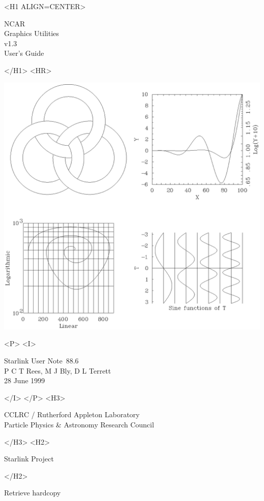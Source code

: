 \documentclass[twoside,11pt]{article}
\newcommand{\stardoccategory}  {Starlink User Note}
\newcommand{\stardocsource}    {sun\stardocnumber}
\newcommand{\stardocnumber}    {88.6}
\newcommand{\stardocauthors}   {P C T Rees, M J Bly, D L Terrett}
\newcommand{\stardocdate}      {28 June 1999}
\newcommand{\stardoctitle}     {NCAR \\ [1ex] Graphics Utilities}
\newcommand{\stardocversion}   {v1.3}
\newcommand{\stardocmanual}    {User's Guide}
\newcommand{\htmladdnormallink}[2]{#1}
\newcommand{\htmladdimg}[1]{}
\newcommand{\xlabel}[1]{}
\renewcommand{\_}{\texttt{\symbol{95}}}
\begin{document}
\begin{htmlonly}
   \xlabel{}
   \begin{rawhtml} <H1 ALIGN=CENTER> \end{rawhtml}
      \stardoctitle\\
      \stardocversion\\
      \stardocmanual
   \begin{rawhtml} </H1> <HR> \end{rawhtml}

\includegraphics[viewport=0 360 450 800,scale=0.8,clip]{sun88_cover.eps}

   \begin{rawhtml} <P> <I> \end{rawhtml}
   \stardoccategory\ \stardocnumber \\
   \stardocauthors \\
   \stardocdate
   \begin{rawhtml} </I> </P> <H3> \end{rawhtml}
      \htmladdnormallink{CCLRC}{http://www.cclrc.ac.uk} /
      \htmladdnormallink{Rutherford Appleton Laboratory}
                        {http://www.cclrc.ac.uk/ral} \\
      \htmladdnormallink{Particle Physics \& Astronomy Research Council}
                        {http://www.pparc.ac.uk} \\
   \begin{rawhtml} </H3> <H2> \end{rawhtml}
      \htmladdnormallink{Starlink Project}{http://www.starlink.ac.uk/}
   \begin{rawhtml} </H2> \end{rawhtml}
   \htmladdnormallink{\htmladdimg{source.gif} Retrieve hardcopy}
      {http://www.starlink.ac.uk/cgi-bin/hcserver?\stardocsource}\\


\end{htmlonly}
\end{document}
